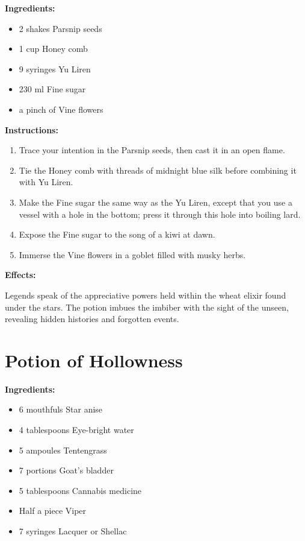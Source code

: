 \documentclass{article}
\begin{document}
\textbf{Ingredients:}

\begin{itemize}
  \item 2 shakes Parsnip seeds
  \item 1 cup Honey comb
  \item 9 syringes Yu Liren
  \item 230 ml Fine sugar
  \item a pinch of Vine flowers
\end{itemize}

\textbf{Instructions:}

\begin{enumerate}
  \item Trace your intention in the Parsnip seeds, then cast it in an open flame.
  \item Tie the Honey comb with threads of midnight blue silk before combining it with Yu Liren.
  \item Make the Fine sugar the same way as the Yu Liren, except that you use a vessel with a hole in the bottom; press it through this hole into boiling lard.
  \item Expose the Fine sugar to the song of a kiwi at dawn.
  \item Immerse the Vine flowers in a goblet filled with musky herbs.
\end{enumerate}

\textbf{Effects:}

Legends speak of the appreciative powers held within the wheat elixir found under the stars. The potion imbues the imbiber with the sight of the unseen, revealing hidden histories and forgotten events.

\newpage
\section*{Potion of Hollowness}

\textbf{Ingredients:}

\begin{itemize}
  \item 6 mouthfuls Star anise
  \item 4 tablespoons Eye-bright water
  \item 5 ampoules Tentengrass
  \item 7 portions Goat's bladder
  \item 5 tablespoons Cannabis medicine
  \item Half a piece Viper
  \item 7 syringes Lacquer or Shellac
\end{itemize}
\end{document}
